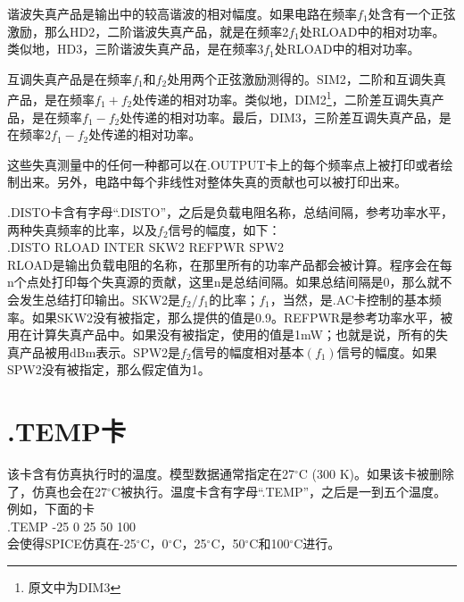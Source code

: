 谐波失真产品是输出中的较高谐波的相对幅度。如果电路在频率$f_1$处含有一个正弦激励，那么HD2，二阶谐波失真产品，就是在频率2$f_1$处RLOAD中的相对功率。类似地，HD3，三阶谐波失真产品，是在频率$3f_1$处RLOAD中的相对功率。

互调失真产品是在频率$f_1$和$f_2$处用两个正弦激励测得的。SIM2，二阶和互调失真产品，是在频率$f_1+f_2$处传递的相对功率。类似地，DIM2\footnote{原文中为DIM3}，二阶差互调失真产品，是在频率$f_1-f_2$处传递的相对功率。最后，DIM3，三阶差互调失真产品，是在频率$2f_1-f_2$处传递的相对功率。

这些失真测量中的任何一种都可以在.OUTPUT卡上的每个频率点上被打印或者绘制出来。另外，电路中每个非线性对整体失真的贡献也可以被打印出来。

.DISTO卡含有字母“.DISTO”，之后是负载电阻名称，总结间隔，参考功率水平，两种失真频率的比率，以及$f_2$信号的幅度，如下：\\
.DISTO RLOAD INTER SKW2 REFPWR SPW2\\
RLOAD是输出负载电阻的名称，在那里所有的功率产品都会被计算。程序会在每n个点处打印每个失真源的贡献，这里n是总结间隔。如果总结间隔是0，那么就不会发生总结打印输出。SKW2是$f_2/f_1$的比率；$f_1$，当然，是.AC卡控制的基本频率。如果SKW2没有被指定，那么提供的值是0.9。REFPWR是参考功率水平，被用在计算失真产品中。如果没有被指定，使用的值是1mW；也就是说，所有的失真产品被用dBm表示。SPW2是$f_2$信号的幅度相对基本$(f_1)$信号的幅度。如果SPW2没有被指定，那么假定值为1。

\section{.TEMP卡}
该卡含有仿真执行时的温度。模型数据通常指定在27$^{\circ}$C (300 K)。如果该卡被删除了，仿真也会在27$^{\circ}$C被执行。温度卡含有字母“.TEMP”，之后是一到五个温度。例如，下面的卡\\
.TEMP -25 0 25 50 100\\
会使得SPICE仿真在-25$^{\circ}$C，0$^{\circ}$C，25$^{\circ}$C，50$^{\circ}$C和100$^{\circ}$C进行。

